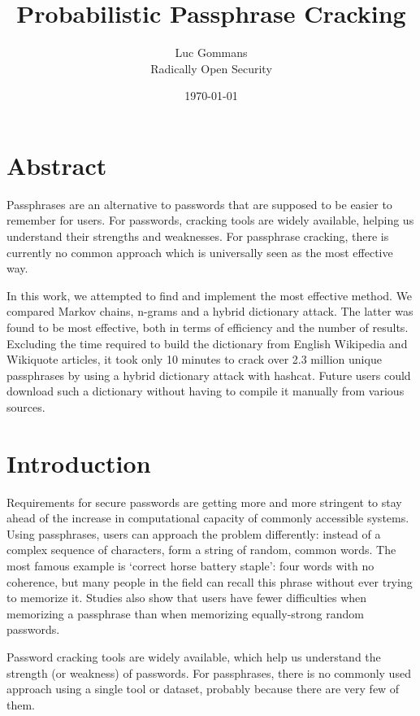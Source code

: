 \documentclass{article}
\begin{document}
\title{Probabilistic Passphrase Cracking}
\date{\today{}}
\author{Luc Gommans \\
	Radically Open Security
}

\maketitle

\section*{Abstract}

Passphrases are an alternative to passwords that are supposed to be easier to
remember for users. For passwords, cracking tools are widely available, helping
us understand their strengths and weaknesses. For passphrase cracking, there is
currently no common approach which is universally seen as the most effective
way.

In this work, we attempted to find and implement the most effective method. We
compared Markov chains, n-grams and a hybrid dictionary attack. The latter was
found to be most effective, both in terms of efficiency and the number of
results. Excluding the time required to build the dictionary from English
Wikipedia and Wikiquote articles, it took only 10 minutes to crack over 2.3
million unique passphrases by using a hybrid dictionary attack with hashcat.
Future users could download such a dictionary without having to compile it
manually from various sources.

\newpage

\section{Introduction}

Requirements for secure passwords are getting more and more stringent to stay
ahead of the increase in computational capacity of commonly accessible systems.
Using passphrases, users can approach the problem differently: instead of a
complex sequence of characters, form a string of random, common words. The most
famous example is `correct horse battery staple': four words with no coherence,
but many people in the field can recall this phrase without ever trying to
memorize it\cite{own}. Studies also show that users have fewer difficulties
when memorizing a passphrase than when memorizing equally-strong random
passwords\cite{behavioral-analysis}\cite{pwd-memorability}.

Password cracking tools are widely available, which help us understand the
strength (or weakness) of passwords. For passphrases, there is no commonly used
approach using a single tool or dataset, probably because there are very few of
them.
\end{document}
